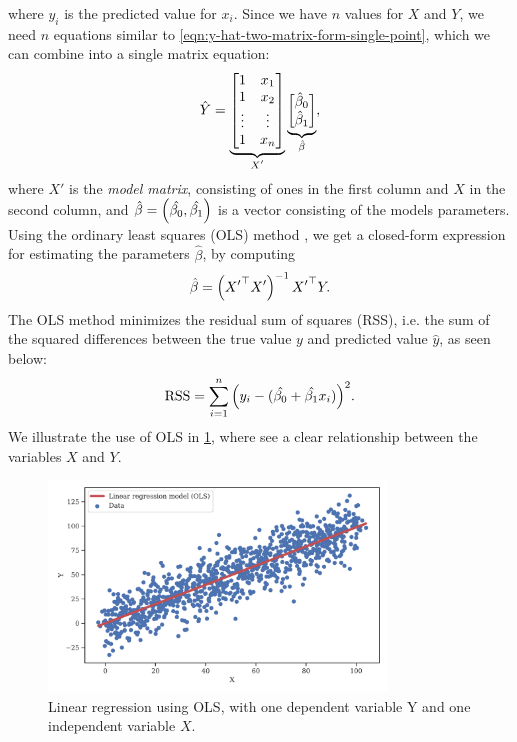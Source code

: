 where $\hat{y_i}$ is the predicted value for $x_i$. Since we have $n$ values for $X$ and $Y$, we need $n$ equations similar to \cref{eqn:y-hat-two-matrix-form-single-point}, which we can combine into a single matrix equation:
\begin{align}
    \hat{Y} =
        \undertext{
        \begin{bmatrix}
            1 & x_1 \\
            1 & x_2 \\
            \vdots & \vdots \\
            1 & x_n \\
        \end{bmatrix}
        }{$X'$}
        \undertext{
        \begin{bmatrix}
            \hat{\beta}_0 \\
            \hat{\beta}_1 \\
        \end{bmatrix}
        }{$\hat{\beta}$},
    \label{eqn:y-hat-two-matrix-form}
\end{align}
where $X'$ is the \textit{model matrix}, consisting of ones in the first column and $X$ in the second column, and $\hat{\beta} = \left(\hat{\beta_0}, \hat{\beta_1}\right)$ is a vector consisting of the models parameters. Using the ordinary least squares (OLS) method \cite[p. 208]{fox2015applied}, we get a closed-form expression for estimating the parameters $\hat{\beta}$, by computing
\begin{align}
    \hat{\beta} = \left({X'}^\top X'\right)^{-1} {X'}^\top Y.
    \label{eqn:ordinary-least-squares}
\end{align}
The OLS method minimizes the residual sum of squares (RSS), i.e. the sum of the squared differences between the true value $y$ and predicted value $\hat{y}$, as seen below:
\begin{align}
    \text{RSS} = \sum\limits_{i=1}^{n}{\left(y_i - (\hat{\beta_0} + \hat{\beta_1}x_i)\right)^2}.
    \label{eqn:RSS-ols-two-variables}
\end{align}
We illustrate the use of OLS in \cref{fig:linear-regression-ols}, where see a clear relationship between the variables $X$ and $Y$.
\begin{figure}[H]
    \centering
    \includegraphics[width=0.8\textwidth]{thesis/figures/linear-regression-example.pdf}
    \caption{Linear regression using OLS, with one dependent variable Y and one independent variable $X$.}
    \label{fig:linear-regression-ols}
\end{figure}

